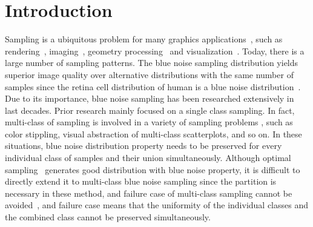 \section{Introduction}
Sampling is a ubiquitous problem for many graphics applications~\cite{Lagae:2008:CPDD},
such as rendering~\cite{Mitchell:1987:generating},
imaging~\cite{Robert:1988:dithering},
geometry processing~\cite{Oztireli:10:Spectral}
and visualization~\cite{chen:2014:visual}.
Today, there is
a large number of sampling patterns.
The blue noise sampling distribution yields superior
image quality over alternative distributions with the same
number of samples since the retina cell distribution of
human is a blue noise distribution~\cite{Yellott:1983:retina}.
Due to its importance,
blue noise sampling has been researched extensively in last decades.
Prior research mainly focused on a single class sampling.
In fact, multi-class of sampling is involved in a variety of sampling problems ,
such as color stippling, visual abstraction of multi-class scatterplots,
and so on.
In these situations,
blue noise distribution property needs to be preserved for every individual class of samples
and their union simultaneously.
Although optimal sampling~\cite{balzer:2009:capacity,chen:2012:variational,de:2012:blue} generates good distribution with blue noise property,
it is difficult to directly extend it to multi-class blue noise sampling since
the partition is necessary in these method,
and failure case of multi-class sampling cannot be avoided~\cite{wei:2010:multi,chen:2012:variational},
and failure case means that the uniformity of the individual classes and the combined class cannot be preserved simultaneously.




